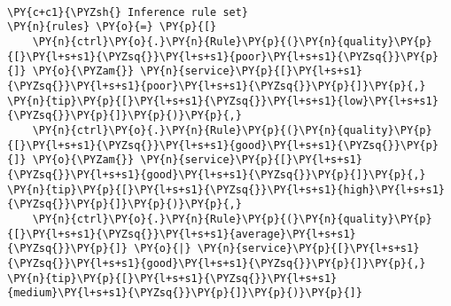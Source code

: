     \begin{center}
    \end{center}
    { \hspace*{\fill} \\}
    
    \begin{center}
    \end{center}
    { \hspace*{\fill} \\}
    
    \begin{center}
    \end{center}
    { \hspace*{\fill} \\}

    \begin{tcolorbox}[breakable, size=fbox, boxrule=1pt, pad at break*=1mm,colback=cellbackground, colframe=cellborder]
\begin{Verbatim}[commandchars=\\\{\}]
\PY{c+c1}{\PYZsh{} Inference rule set}
\PY{n}{rules} \PY{o}{=} \PY{p}{[}
    \PY{n}{ctrl}\PY{o}{.}\PY{n}{Rule}\PY{p}{(}\PY{n}{quality}\PY{p}{[}\PY{l+s+s1}{\PYZsq{}}\PY{l+s+s1}{poor}\PY{l+s+s1}{\PYZsq{}}\PY{p}{]} \PY{o}{\PYZam{}} \PY{n}{service}\PY{p}{[}\PY{l+s+s1}{\PYZsq{}}\PY{l+s+s1}{poor}\PY{l+s+s1}{\PYZsq{}}\PY{p}{]}\PY{p}{,} \PY{n}{tip}\PY{p}{[}\PY{l+s+s1}{\PYZsq{}}\PY{l+s+s1}{low}\PY{l+s+s1}{\PYZsq{}}\PY{p}{]}\PY{p}{)}\PY{p}{,}
    \PY{n}{ctrl}\PY{o}{.}\PY{n}{Rule}\PY{p}{(}\PY{n}{quality}\PY{p}{[}\PY{l+s+s1}{\PYZsq{}}\PY{l+s+s1}{good}\PY{l+s+s1}{\PYZsq{}}\PY{p}{]} \PY{o}{\PYZam{}} \PY{n}{service}\PY{p}{[}\PY{l+s+s1}{\PYZsq{}}\PY{l+s+s1}{good}\PY{l+s+s1}{\PYZsq{}}\PY{p}{]}\PY{p}{,} \PY{n}{tip}\PY{p}{[}\PY{l+s+s1}{\PYZsq{}}\PY{l+s+s1}{high}\PY{l+s+s1}{\PYZsq{}}\PY{p}{]}\PY{p}{)}\PY{p}{,}
    \PY{n}{ctrl}\PY{o}{.}\PY{n}{Rule}\PY{p}{(}\PY{n}{quality}\PY{p}{[}\PY{l+s+s1}{\PYZsq{}}\PY{l+s+s1}{average}\PY{l+s+s1}{\PYZsq{}}\PY{p}{]} \PY{o}{|} \PY{n}{service}\PY{p}{[}\PY{l+s+s1}{\PYZsq{}}\PY{l+s+s1}{good}\PY{l+s+s1}{\PYZsq{}}\PY{p}{]}\PY{p}{,} \PY{n}{tip}\PY{p}{[}\PY{l+s+s1}{\PYZsq{}}\PY{l+s+s1}{medium}\PY{l+s+s1}{\PYZsq{}}\PY{p}{]}\PY{p}{)}\PY{p}{]}
\end{Verbatim}
\end{tcolorbox}

